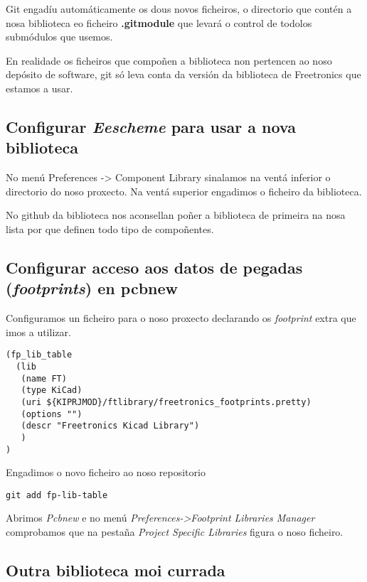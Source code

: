 Git engadíu automáticamente os dous novos ficheiros, o directorio que
contén a nosa biblioteca eo ficheiro \textbf{.gitmodule} que levará o
control de todolos submódulos que usemos.

En realidade os ficheiros que compoñen a biblioteca non pertencen ao
noso depósito de software, git só leva conta da versión da biblioteca de
Freetronics que estamos a usar.

\subsection{\texorpdfstring{Configurar \emph{Eescheme} para usar a nova
biblioteca}{Configurar Eescheme para usar a nova biblioteca}}\label{configurar-eescheme-para-usar-a-nova-biblioteca}

No menú Preferences -\textgreater{} Component Library sinalamos na ventá
inferior o directorio do noso proxecto. Na ventá superior engadimos o
ficheiro da biblioteca.

No github da biblioteca nos aconsellan poñer a biblioteca de primeira na
nosa lista por que definen todo tipo de compoñentes.

\subsection{\texorpdfstring{Configurar acceso aos datos de pegadas
(\emph{footprints}) en
pcbnew}{Configurar acceso aos datos de pegadas (footprints) en pcbnew}}\label{configurar-acceso-aos-datos-de-pegadas-footprints-en-pcbnew}

Configuramos un ficheiro para o noso proxecto declarando os
\emph{footprint} extra que imos a utilizar.

\begin{verbatim}
(fp_lib_table
  (lib
   (name FT)
   (type KiCad)
   (uri ${KIPRJMOD}/ftlibrary/freetronics_footprints.pretty)
   (options "")
   (descr "Freetronics Kicad Library")
   )
)
\end{verbatim}

Engadimos o novo ficheiro ao noso repositorio

\begin{verbatim}
git add fp-lib-table
\end{verbatim}

Abrimos \emph{Pcbnew} e no menú
\emph{Preferences-\textgreater{}Footprint Libraries Manager} comprobamos
que na pestaña \emph{Project Specific Libraries} figura o noso ficheiro.

\subsection{Outra biblioteca moi
currada}\label{outra-biblioteca-moi-currada}

